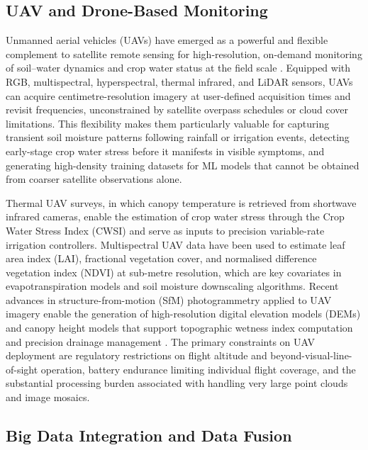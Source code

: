 \documentclass[land,article,submit,pdftex,moreauthors]{Definitions/mdpi}
\numberwithin{equation}{section}
\begin{document}
\subsection{UAV and Drone-Based Monitoring}

Unmanned aerial vehicles (UAVs) have emerged as a powerful and flexible complement to satellite remote sensing for high-resolution, on-demand monitoring of soil--water dynamics and crop water status at the field scale \citep{mulla2013twenty}. Equipped with RGB, multispectral, hyperspectral, thermal infrared, and LiDAR sensors, UAVs can acquire centimetre-resolution imagery at user-defined acquisition times and revisit frequencies, unconstrained by satellite overpass schedules or cloud cover limitations. This flexibility makes them particularly valuable for capturing transient soil moisture patterns following rainfall or irrigation events, detecting early-stage crop water stress before it manifests in visible symptoms, and generating high-density training datasets for ML models that cannot be obtained from coarser satellite observations alone.

Thermal UAV surveys, in which canopy temperature is retrieved from shortwave infrared cameras, enable the estimation of crop water stress through the Crop Water Stress Index (CWSI) \citep{jones2004use} and serve as inputs to precision variable-rate irrigation controllers. Multispectral UAV data have been used to estimate leaf area index (LAI), fractional vegetation cover, and normalised difference vegetation index (NDVI) at sub-metre resolution, which are key covariates in evapotranspiration models and soil moisture downscaling algorithms. Recent advances in structure-from-motion (SfM) photogrammetry applied to UAV imagery enable the generation of high-resolution digital elevation models (DEMs) and canopy height models that support topographic wetness index computation and precision drainage management \citep{yao2019uav}. The primary constraints on UAV deployment are regulatory restrictions on flight altitude and beyond-visual-line-of-sight operation, battery endurance limiting individual flight coverage, and the substantial processing burden associated with handling very large point clouds and image mosaics.

\subsection{Big Data Integration and Data Fusion}
\end{document}
